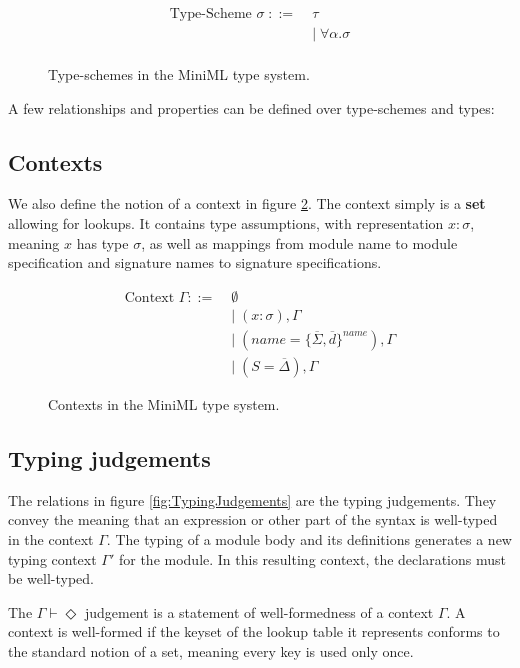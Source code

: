 \documentclass[10pt,a4paper,draft]{article}
\begin{document}
\begin{flushleft}
\begin{figure}[!htbp]
\begin{align*}
\text{Type-Scheme } \sigma \; ::= \; &\tau \\
&| \; \forall \alpha . \sigma \\
\end{align*}
\caption{Type-schemes in the MiniML type system.}
\label{fig:Type-schemes}
\end{figure}

A few relationships and properties can be defined over type-schemes and types: 

\subsection{Contexts}
We also define the notion of a context in figure \ref{fig:Contexts}. The context simply is a \textbf{set} allowing for lookups. It contains type assumptions, with representation $x:\sigma$, meaning $x$ has type $\sigma$, as well as mappings from module name to module specification and signature names to signature specifications.

\begin{figure}[!htbp]
\begin{align*}
\text{Context }\Gamma ::=\; &\emptyset \\
&| \; (x:\sigma),\Gamma \\
&| \; (name=\lbrace \overline{\Sigma},\overline{d}\rbrace^{name}), \Gamma \\
&| \; (S= \overline{\Delta}), \Gamma
\end{align*}
\caption{Contexts in the MiniML type system.}
\label{fig:Contexts}
\end{figure}

\subsection{Typing judgements}
The relations in figure \ref{fig:TypingJudgements} are the typing judgements. They convey the meaning that an expression or other part of the syntax is well-typed in the context $\Gamma$. The typing of a module body and its definitions generates a new typing context $\Gamma'$ for the module. In this resulting context, the declarations must be well-typed.

The $\Gamma \vdash \Diamond$ judgement is a statement of well-formedness of a context $\Gamma$. A context is well-formed if the keyset of the lookup table it represents conforms to the standard notion of a set, meaning every key is used only once.


\end{flushleft}
\end{document}
